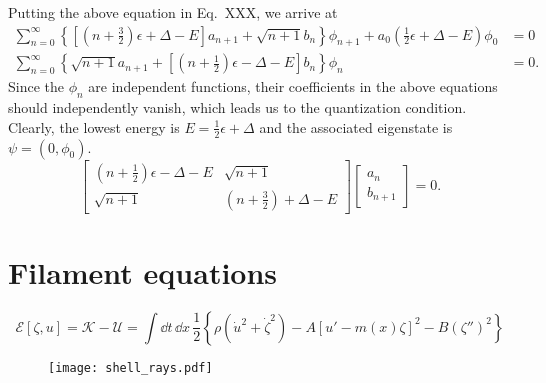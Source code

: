 %
Putting the above equation in Eq.~XXX, we arrive at
%
\begin{equation}
   \begin{aligned}
     \sum_{n = 0}^{\infty} \left\{\left[\left(n +  \tfrac{3}{2}\right)\epsilon + \Delta - E\right]a_{n + 1} + \sqrt{n + 1}b_{n}\right\}\phi_{n+1}  + a_{0}\left(\tfrac{1}{2}\epsilon + \Delta - E\right)\phi_{0}&= 0\\
     \sum_{n = 0}^{\infty} \left\{\sqrt{n + 1}a_{n+1} + \left[\left(n +  \tfrac{1}{2}\right)\epsilon - \Delta - E\right]b_{n}\right\}\phi_{n} &= 0.
   \end{aligned}
\end{equation}
%
Since the $\phi_{n}$ are independent functions, their coefficients in the above equations should independently vanish, which leads us to the quantization condition.
Clearly, the lowest energy is $E = \tfrac{1}{2}\epsilon + \Delta$ and the associated eigenstate is $\psi = (0, \phi_{0})$.
%
\begin{equation}
  \begin{bmatrix}
    \left(n + \tfrac{1}{2}\right)\epsilon - \Delta - E & \sqrt{n + 1}\\
    \sqrt{n + 1} & \left(n + \tfrac{3}{2}\right) + \Delta - E
  \end{bmatrix}
  \begin{bmatrix}
    a_{n}\\
    b_{n + 1}
  \end{bmatrix}
  = 0.
\end{equation}
%

\section{Filament equations}

%
\begin{equation}
  \mathscr{E}[\zeta, u] = \mathscr{K} - \mathscr{U} = \int \dd{t}\,\dd{x}\,\frac{1}{2}\left\{\rho\left(\dot{u}^{2} + \dot{\zeta}^{2}\right) - A\left[u' - m(x)\zeta\right]^{2} - B\left(\zeta''\right)^{2}\right\}
\end{equation}
%
\begin{figure}
  \begin{center}
    \texttt{[image: shell\_rays.pdf]}
  \end{center}
\end{figure}

